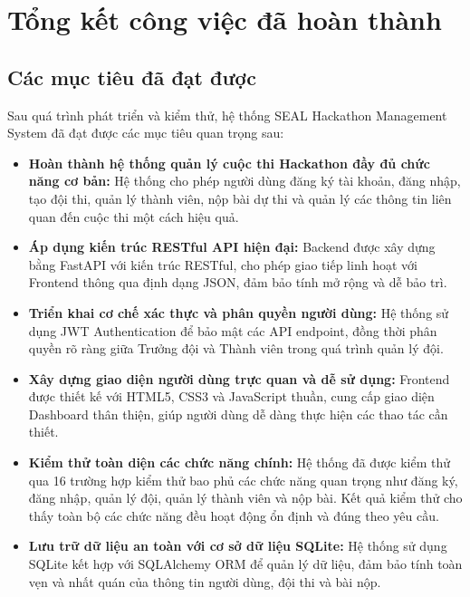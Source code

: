 
\section{Tổng kết công việc đã hoàn thành}

\subsection{Các mục tiêu đã đạt được}

Sau quá trình phát triển và kiểm thử, hệ thống SEAL Hackathon Management System đã đạt được các mục tiêu quan trọng sau:

\begin{itemize}
	\item \textbf{Hoàn thành hệ thống quản lý cuộc thi Hackathon đầy đủ chức năng cơ bản:} Hệ thống cho phép người dùng đăng ký tài khoản, đăng nhập, tạo đội thi, quản lý thành viên, nộp bài dự thi và quản lý các thông tin liên quan đến cuộc thi một cách hiệu quả.
	
	\item \textbf{Áp dụng kiến trúc RESTful API hiện đại:} Backend được xây dựng bằng FastAPI với kiến trúc RESTful, cho phép giao tiếp linh hoạt với Frontend thông qua định dạng JSON, đảm bảo tính mở rộng và dễ bảo trì.
	
	\item \textbf{Triển khai cơ chế xác thực và phân quyền người dùng:} Hệ thống sử dụng JWT Authentication để bảo mật các API endpoint, đồng thời phân quyền rõ ràng giữa Trưởng đội và Thành viên trong quá trình quản lý đội.
	
	\item \textbf{Xây dựng giao diện người dùng trực quan và dễ sử dụng:} Frontend được thiết kế với HTML5, CSS3 và JavaScript thuần, cung cấp giao diện Dashboard thân thiện, giúp người dùng dễ dàng thực hiện các thao tác cần thiết.
	
	\item \textbf{Kiểm thử toàn diện các chức năng chính:} Hệ thống đã được kiểm thử qua 16 trường hợp kiểm thử bao phủ các chức năng quan trọng như đăng ký, đăng nhập, quản lý đội, quản lý thành viên và nộp bài. Kết quả kiểm thử cho thấy toàn bộ các chức năng đều hoạt động ổn định và đúng theo yêu cầu.
	
	\item \textbf{Lưu trữ dữ liệu an toàn với cơ sở dữ liệu SQLite:} Hệ thống sử dụng SQLite kết hợp với SQLAlchemy ORM để quản lý dữ liệu, đảm bảo tính toàn vẹn và nhất quán của thông tin người dùng, đội thi và bài nộp.
	

\end{itemize}
